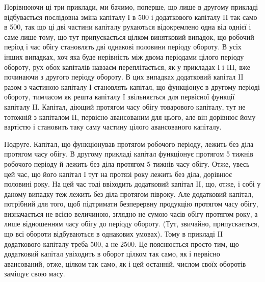 Порівнюючи ці три приклади, ми бачимо, поперше, що лише в другому
прикладі відбувається послідовна зміна капіталу І в 500
і додаткового капіталу II так само в 500, так що ці дві частини
капіталу рухаються відокремлено одна від однієї і саме лише тому, що
тут припускається цілком винятковий випадок, що робочий період і час
обігу становлять дві однакові половини періоду обороту. В усіх інших
випадках, хоч яка буде нерівність між двома періодами цілого періоду
обороту, рух обох капіталів навзаєм переплітається, як у прикладах
І і III, вже починаючи з другого періоду обороту. В цих випадках додатковий
капітал II разом з частиною капіталу І становлять капітал, що функціонує
в другому періоді обороту, тимчасом як решта капіталу І звільняється
для первісної функції капіталу II. Капітал, діющий протягом часу
обігу товарового капіталу, тут не тотожній з капіталом II, первісно авансованим
для цього, але він дорівнює йому вартістю і становить таку саму
частину цілого авансованого капіталу.

Подруге. Капітал, що функціонував протягом робочого періоду,
лежить без діла протягом часу обігу. В другому прикладі капітал функціонує
протягом 5 тижнів робочого періоду й лежить без діла протягом
5 тижнів часу обігу. Отже, увесь цей час, що його капітал І тут на протязі
року лежить без діла, дорівнює половині року. На цей час тоді ввіходить
додатковий капітал II, що, отже, і собі у даному випадку теж лежить без діла
протягом півроку. Але додатковий капітал, потрібний для того, щоб підтримати
безперервну продукцію протягом часу обігу, визначається не
всією величиною, зглядно не сумою часів обігу протягом року, а лише
відношенням часу обігу до періоду обороту. (Тут, звичайно, припускається,
що всі обороти відбуваються в однакових умовах). Тому в прикладі
II додаткового капіталу треба 500, а не 2500.
Це пояснюється просто тим, що додатковий капітал увіходить в оборот
цілком так само, як і первісно авансований, отже, цілком так само, як
і цей останній, числом своїх оборотів заміщує свою масу.

